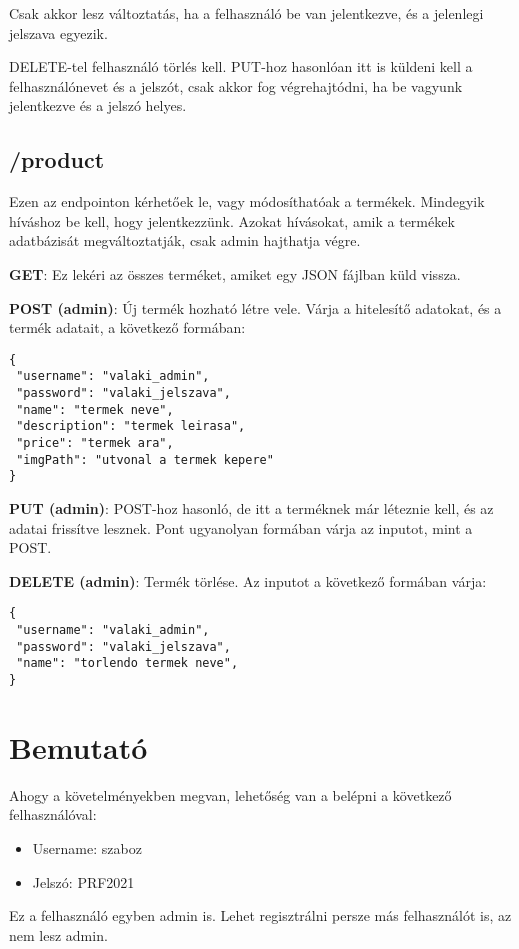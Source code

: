 \documentclass[]{article}
\begin{document}
Csak akkor lesz változtatás, ha a felhasználó be van jelentkezve, és a jelenlegi jelszava egyezik.

DELETE-tel felhasználó törlés kell. PUT-hoz hasonlóan itt is küldeni kell a felhasználónevet és a jelszót, csak akkor fog végrehajtódni, ha be vagyunk jelentkezve és a jelszó helyes.

\subsection{/product}

Ezen az endpointon kérhetőek le, vagy módosíthatóak a termékek. Mindegyik híváshoz be kell, hogy jelentkezzünk. Azokat hívásokat, amik a termékek adatbázisát megváltoztatják, csak admin hajthatja végre.

\noindent
\textbf{GET}: Ez lekéri az összes terméket, amiket egy JSON fájlban küld vissza.

\noindent
\textbf{POST (admin)}: Új termék hozható létre vele. Várja a hitelesítő adatokat, és a termék adatait, a következő formában:

\bigskip
\begin{lstlisting}
{
 "username": "valaki_admin",
 "password": "valaki_jelszava",
 "name": "termek neve",
 "description": "termek leirasa",
 "price": "termek ara",
 "imgPath": "utvonal a termek kepere"
}
\end{lstlisting}

\bigskip
\noindent
\textbf{PUT (admin)}: POST-hoz hasonló, de itt a terméknek már léteznie kell, és az adatai frissítve lesznek. Pont ugyanolyan formában várja az inputot, mint a POST.

\noindent
\textbf{DELETE (admin)}: Termék törlése. Az inputot a következő formában várja:

\bigskip
\begin{lstlisting}
{
 "username": "valaki_admin",
 "password": "valaki_jelszava",
 "name": "torlendo termek neve",
}
\end{lstlisting}

\section{Bemutató}

Ahogy a követelményekben megvan, lehetőség van a belépni a következő felhasználóval:

\begin{itemize}
	\item Username: szaboz
	\item Jelszó: PRF2021
\end{itemize}

Ez a felhasználó egyben admin is. Lehet regisztrálni persze más felhasználót is, az nem lesz admin.
\end{document}
